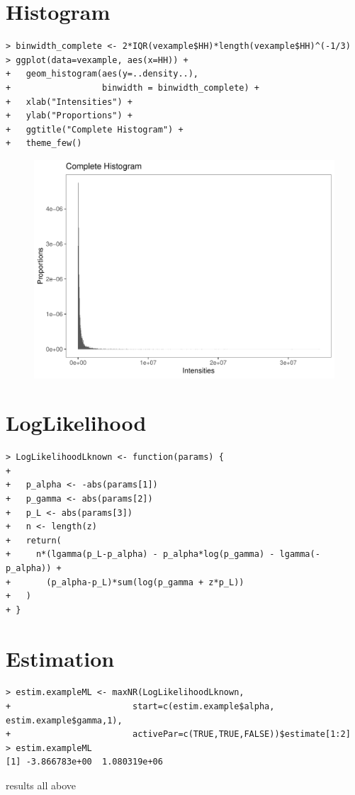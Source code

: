 \documentclass{article}
\begin{document}
\section{Histogram}
\begin{lstlisting}[frame=tb]
> binwidth_complete <- 2*IQR(vexample$HH)*length(vexample$HH)^(-1/3)
> ggplot(data=vexample, aes(x=HH)) + 
+   geom_histogram(aes(y=..density..), 
+                  binwidth = binwidth_complete) + 
+   xlab("Intensities") +
+   ylab("Proportions") +
+   ggtitle("Complete Histogram") +
+   theme_few()
\end{lstlisting}
\begin{figure}
	\centering
	\includegraphics[width=0.5\linewidth]{HistogramExample.pdf}
	\caption{}
	\label{fig:HistogramExample}
\end{figure}

\section{LogLikelihood}
\begin{lstlisting}[frame=tb]
> LogLikelihoodLknown <- function(params) {
+   
+   p_alpha <- -abs(params[1])
+   p_gamma <- abs(params[2])
+   p_L <- abs(params[3])
+   n <- length(z)
+   return(
+     n*(lgamma(p_L-p_alpha) - p_alpha*log(p_gamma) - lgamma(-p_alpha)) + 
+       (p_alpha-p_L)*sum(log(p_gamma + z*p_L)) 
+   )
+ }
\end{lstlisting}
\section{Estimation}
\begin{lstlisting}[frame=tb]
> estim.exampleML <- maxNR(LogLikelihoodLknown, 
+                        start=c(estim.example$alpha, estim.example$gamma,1), 
+                        activePar=c(TRUE,TRUE,FALSE))$estimate[1:2]
> estim.exampleML
[1] -3.866783e+00  1.080319e+06
\end{lstlisting}
results all above
\end{document}
